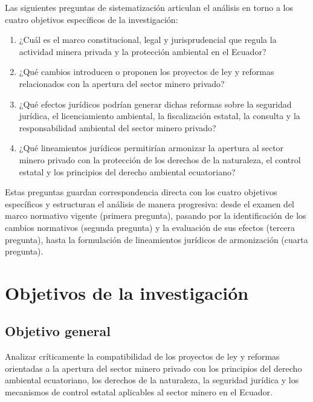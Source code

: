 Las siguientes preguntas de sistematización articulan el análisis en torno a los cuatro objetivos específicos de la investigación:

\begin{enumerate}
    \item ¿Cuál es el marco constitucional, legal y jurisprudencial que regula la actividad minera privada y la protección ambiental en el Ecuador?

    \item ¿Qué cambios introducen o proponen los proyectos de ley y reformas relacionados con la apertura del sector minero privado?

    \item ¿Qué efectos jurídicos podrían generar dichas reformas sobre la seguridad jurídica, el licenciamiento ambiental, la fiscalización estatal, la consulta y la responsabilidad ambiental del sector minero privado?

    \item ¿Qué lineamientos jurídicos permitirían armonizar la apertura al sector minero privado con la protección de los derechos de la naturaleza, el control estatal y los principios del derecho ambiental ecuatoriano?
\end{enumerate}

Estas preguntas guardan correspondencia directa con los cuatro objetivos específicos y estructuran el análisis de manera progresiva: desde el examen del marco normativo vigente (primera pregunta), pasando por la identificación de los cambios normativos (segunda pregunta) y la evaluación de sus efectos (tercera pregunta), hasta la formulación de lineamientos jurídicos de armonización (cuarta pregunta).

\section{Objetivos de la investigación}

\subsection{Objetivo general}

Analizar críticamente la compatibilidad de los proyectos de ley y reformas orientadas a la apertura del sector minero privado con los principios del derecho ambiental ecuatoriano, los derechos de la naturaleza, la seguridad jurídica y los mecanismos de control estatal aplicables al sector minero en el Ecuador.

